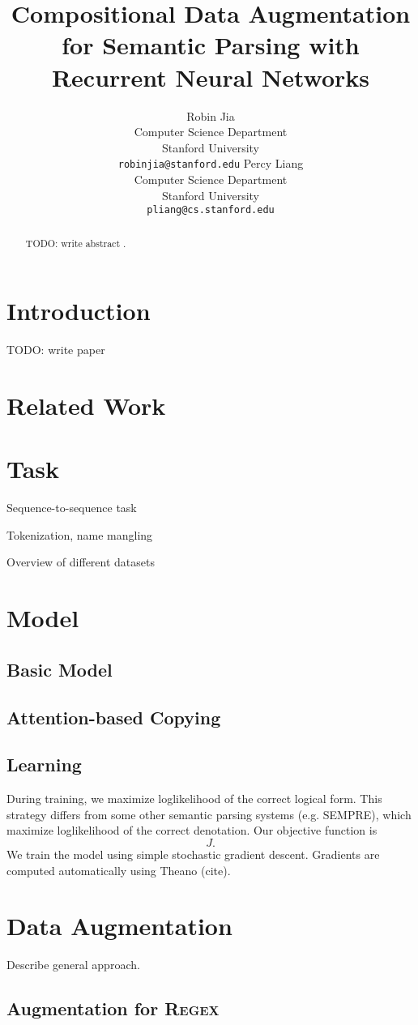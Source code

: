 \documentclass[11pt,letterpaper]{article}
\title{Compositional Data Augmentation for Semantic Parsing with Recurrent Neural Networks}
\author{Robin Jia\\
	    Computer Science Department\\
      Stanford University\\
	    {\tt robinjia@stanford.edu}
	  \And
    Percy Liang\\
    Computer Science Department\\
  	Stanford University\\
  {\tt pliang@cs.stanford.edu}}
\date{}
\newcommand{\regex}{\textsc{Regex}\xspace}
\begin{document}
\maketitle

\begin{abstract}
  TODO: write abstract \cite{liang2013lambdadcs}.
\end{abstract}

\section{Introduction}
TODO: write paper

\section{Related Work}
\section{Task}
Sequence-to-sequence task

Tokenization, name mangling

Overview of different datasets

\section{Model}
\subsection{Basic Model}
\subsection{Attention-based Copying}
\subsection{Learning}
During training, we maximize loglikelihood of the correct
logical form.
This strategy differs from some other semantic parsing systems
(e.g. SEMPRE), which maximize loglikelihood of the correct
denotation.  Our objective function is \[
  J.
\]
We train the model using simple stochastic gradient descent.
Gradients are computed automatically using Theano (cite).

\section{Data Augmentation}
Describe general approach.
\subsection{Augmentation for \regex}
\end{document}
